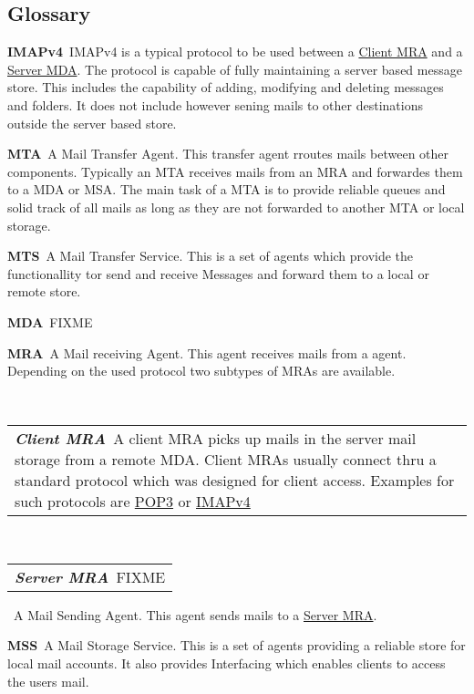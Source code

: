 \documentclass[10pt,a4paper]{book}
\makeatletter
\newenvironment{entry}{\par\leavevmode\hangpara{1.5mm}{1}\ignorespaces}{\RaggedRight\par}
\newcommand*{\mainentry}[2]{{\bfseries{#1\label{def:#1}}}~#2\par}
\newcommand*{\subentry}[2]{\par~\begin{tabular}{p{\textwidth-.6cm}@{}}{\bfseries{\itshape{#1\label{def:#1}}}}~#2\end{tabular}}
\newcommand*{\defref}[1]{\hyperref[def:#1]{#1}}
\makeatother
\begin{document}
\backmatter
\begin{appendices}
\chapter{Glossary}

\begin{entry}
  \mainentry{IMAPv4}{IMAPv4 is a typical protocol to be used between a \defref{Client MRA} and a \defref{Server MDA}. The protocol is capable of fully maintaining a server based message store. This includes the capability of adding, modifying and deleting messages and folders. It does not include however sening mails to other destinations outside the server based store.}
\end{entry}

\begin{entry}
  \mainentry{MTA}{A Mail Transfer Agent. This transfer agent rroutes mails between other components. Typically  an MTA receives mails from an MRA and forwardes them to a MDA or MSA. The main task of a MTA is to provide reliable queues and solid track of all mails as long as they are not forwarded to another MTA or local storage.}
\end{entry}

\begin{entry}
  \mainentry{MTS}{A Mail Transfer Service. This is a set of agents which provide the functionallity tor send and receive Messages and forward them to a local or remote store.}
\end{entry}

\begin{entry}
  \mainentry{MDA}{FIXME}
\end{entry}

\begin{entry}
  \mainentry{MRA}{A Mail receiving Agent. This agent receives mails from a agent. Depending on the used protocol two subtypes of MRAs are available.
  \subentry{Client MRA}{A client MRA picks up mails in the server mail storage from a remote MDA. Client MRAs usually connect thru a standard protocol which was designed for client access. Examples for such protocols are \defref{POP3} or \defref{IMAPv4}}
  \subentry{Server MRA}{FIXME} }
\end{entry}
\begin{entry}\mainentry{MSA}{A Mail Sending Agent. This agent sends mails to a \defref{Server MRA}. }\end{entry}

\begin{entry}
  \mainentry{MSS}{A Mail Storage Service. This is a set of agents providing a reliable store for local mail accounts. It also provides Interfacing which enables clients to access the users mail.}
\end{entry}


\end{appendices}
\end{document}
